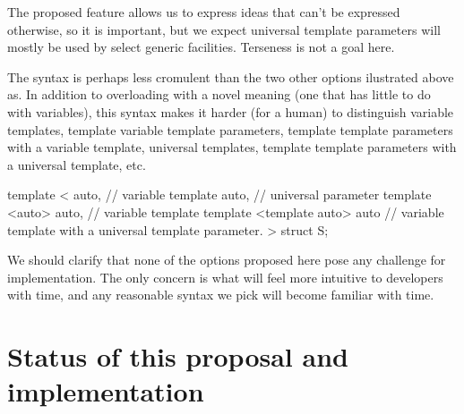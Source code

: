 \documentclass{wg21}
\begin{document}
%


The proposed feature allows us to express ideas that can't be expressed otherwise, so it is important,
but we expect universal template parameters will mostly be used by select generic facilities. Terseness is not a goal here.

The  syntax is perhaps less cromulent than the two other options ilustrated above as. In addition to overloading
 with a novel meaning (one that has little to do with variables), this syntax makes it harder (for a human) to distinguish
variable templates, template variable template parameters, template template parameters with a variable template, universal templates,
template template parameters with a universal template, etc.

\begin{colorblock}
template <
   auto, // variable
   template auto, // universal parameter
   template <auto> auto, // variable template
   template <template auto> auto // variable template with a universal template parameter.
>
struct S;
\end{colorblock}


We should clarify that none of the options proposed here pose any challenge for implementation. The only concern is what will feel more intuitive to
developers with time, and any reasonable syntax we pick will become familiar with time.


\section{Status of this proposal and implementation}
\end{document}
